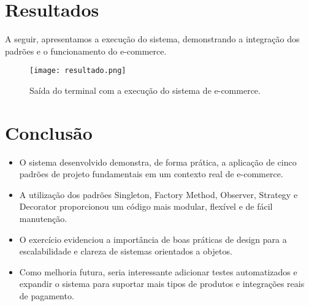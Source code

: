 \documentclass[
    12pt,
    oneside,
    a4paper,
    english,
    brazil,
]{abntex2}
\begin{document}
\section{Resultados}
A seguir, apresentamos a execução do sistema, demonstrando a integração dos padrões e o funcionamento do e-commerce.\newline
\begin{figure}[h!]
  \centering
  \texttt{[image: resultado.png]}
  \caption{Saída do terminal com a execução do sistema de e-commerce.}
  \label{fig:resultados}
\end{figure}

\section{Conclusão}
\begin{itemize}
    \item O sistema desenvolvido demonstra, de forma prática, a aplicação de cinco padrões de projeto fundamentais em um contexto real de e-commerce.
    \item A utilização dos padrões Singleton, Factory Method, Observer, Strategy e Decorator proporcionou um código mais modular, flexível e de fácil manutenção.
    \item O exercício evidenciou a importância de boas práticas de design para a escalabilidade e clareza de sistemas orientados a objetos.
    \item Como melhoria futura, seria interessante adicionar testes automatizados e expandir o sistema para suportar mais tipos de produtos e integrações reais de pagamento.
\end{itemize}
\end{document}
